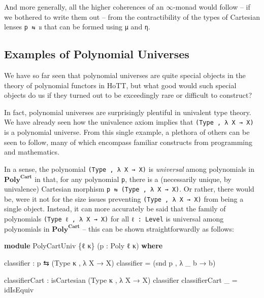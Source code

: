 \documentclass[
  11pt,
  oneside,
  article]{memoir}
\newenvironment{Shaded}{}{}
\newcommand{\KeywordTok}[1]{\textcolor[rgb]{0.00,0.44,0.13}{\textbf{#1}}}
\newcommand{\NormalTok}[1]{#1}
\newcommand{\OtherTok}[1]{\textcolor[rgb]{0.00,0.44,0.13}{#1}}
\theoremstyle{definition}
\theoremstyle{plain}
\newcommand{\0}{\textsf{0}}
\newcommand{\1}{\tn{\textsf{1}}}
\begin{document}
And more generally, all the higher coherences of an \(\infty\)-monad
would follow -- if we bothered to write them out -- from the
contractibility of the types of Cartesian lenses \texttt{p\ ⇆\ 𝔲} that
can be formed using \texttt{μ} and \texttt{η}.

\subsection{Examples of Polynomial
Universes}\label{examples-of-polynomial-universes}

We have so far seen that polynomial universes are quite special objects
in the theory of polynomial functors in HoTT, but what good would such
special objects do us if they turned out to be exceedingly rare or
difficult to construct?

In fact, polynomial universes are surprisingly plentiful in univalent
type theory. We have already seen how the univalence axiom implies that
\texttt{(Type\ ,\ λ\ X\ →\ X)} is a polynomial universe. From this
single example, a plethora of others can be seen to follow, many of
which encompass familiar constructs from programming and mathematics.

In a sense, the polynomial \texttt{(Type\ ,\ λ\ X\ →\ X)} is
\emph{universal} among polynomials in \(\mathbf{Poly}^{\mathbf{Cart}}\)
in that, for any polynomial \texttt{p}, there is a (necessarily unique,
by univalence) Cartesian morphism \texttt{p\ ⇆\ (Type\ ,\ λ\ X\ →\ X)}.
Or rather, there would be, were it not for the size issues preventing
\texttt{(Type\ ,\ λ\ X\ →\ X)} from being a single object. Instead, it
can more accurately be said that the family of polynomials
\texttt{(Type\ ℓ\ ,\ λ\ X\ →\ X)} for all \texttt{ℓ\ :\ Level} is
universal among polynomials in \(\mathbf{Poly}^{\mathbf{Cart}}\) -- this
can be shown straightforwardly as follows:

\begin{Shaded}
\begin{Highlighting}[]
\KeywordTok{module}\NormalTok{ PolyCartUniv }\OtherTok{\{}\NormalTok{ℓ κ}\OtherTok{\}} \OtherTok{(}\NormalTok{p }\OtherTok{:}\NormalTok{ Poly ℓ κ}\OtherTok{)} \KeywordTok{where}

\NormalTok{    classifier }\OtherTok{:}\NormalTok{ p ⇆ }\OtherTok{(}\NormalTok{Type κ , }\OtherTok{λ}\NormalTok{ X }\OtherTok{→}\NormalTok{ X}\OtherTok{)}
\NormalTok{    classifier }\OtherTok{=} \OtherTok{(}\NormalTok{snd p , }\OtherTok{λ} \OtherTok{\_}\NormalTok{ b }\OtherTok{→}\NormalTok{ b}\OtherTok{)}

\NormalTok{    classifierCart }\OtherTok{:}\NormalTok{ isCartesian }\OtherTok{(}\NormalTok{Type κ , }\OtherTok{λ}\NormalTok{ X }\OtherTok{→}\NormalTok{ X}\OtherTok{)}\NormalTok{ classifier}
\NormalTok{    classifierCart }\OtherTok{\_} \OtherTok{=}\NormalTok{ idIsEquiv}
\end{Highlighting}
\end{Shaded}
\end{document}
